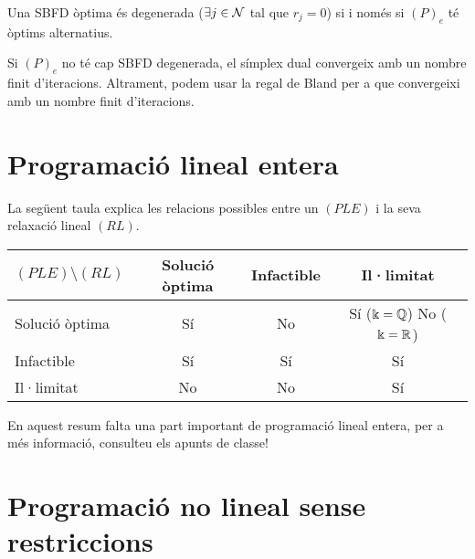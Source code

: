 \begin{prop}
    Una SBFD òptima és degenerada ($\exists j \in \mathcal{N}$ tal que $r_j = 0$) si i només si $(P)_e$ té òptims alternatius.
\end{prop}
\begin{prop}
    Si $(P)_e$ no té cap SBFD degenerada, el símplex dual convergeix amb un nombre finit d'iteracions. Altrament, podem usar la regal de Bland per a que convergeixi amb un nombre finit d'iteracions.
\end{prop}

\section{Programació lineal entera}

\begin{obs}
    La següent taula explica les relacions possibles entre un $(PLE)$ i la seva relaxació lineal $(RL)$.
    \begin{center}
        \begin{tabular}{|l|c|c|c|} \hline
            $(PLE) \setminus (RL)$ & Solució òptima & Infactible & Il·limitat \\ \hline
            Solució òptima & Sí & No & \thead{Sí ($\Bbbk = \mathbb{Q}$) \\ No ($\Bbbk = \mathbb{R}$)} \\ \hline
            Infactible & Sí & Sí & Sí \\ \hline
            Il·limitat & No & No & Sí \\ \hline
        \end{tabular}
    \end{center}
\end{obs}

En aquest resum falta una part important de programació lineal entera, per a més informació, consulteu els apunts de classe!

\section{Programaci\'o no lineal sense restriccions}

